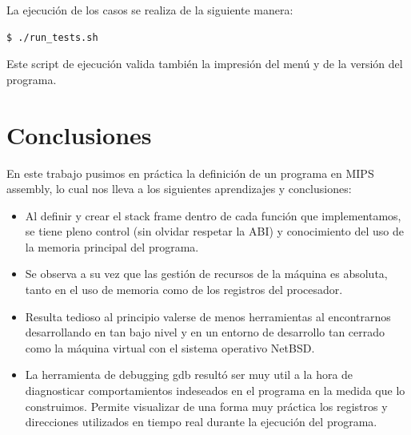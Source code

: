 \documentclass[a4paper,10pt, spanish]{article}
\begin{document}
La ejecución de los casos se realiza de la siguiente manera:

\begin{lstlisting}
$ ./run_tests.sh
\end{lstlisting}

Este script de ejecución valida también la impresión del menú y de la versión del programa.

\section{Conclusiones}

En este trabajo pusimos en práctica la definición de un programa en MIPS assembly, lo cual nos lleva a los siguientes aprendizajes y conclusiones:

\begin{itemize}
  \item Al definir y crear el stack frame dentro de cada función que implementamos, se tiene pleno control (sin olvidar respetar la ABI) y conocimiento del uso de la memoria principal del programa.
  \item Se observa a su vez que las gestión de recursos de la máquina es absoluta, tanto en el uso de memoria como de los registros del procesador.
  \item Resulta tedioso al principio valerse de menos herramientas al encontrarnos desarrollando en tan bajo nivel y en un entorno de desarrollo tan cerrado como la máquina virtual con el sistema operativo NetBSD.
  \item La herramienta de debugging gdb resultó ser muy util a la hora de diagnosticar comportamientos indeseados en el programa en la medida que lo construimos. Permite visualizar de una forma muy práctica los registros y direcciones utilizados en tiempo real durante la ejecución del programa.
\end{itemize}
\end{document}
